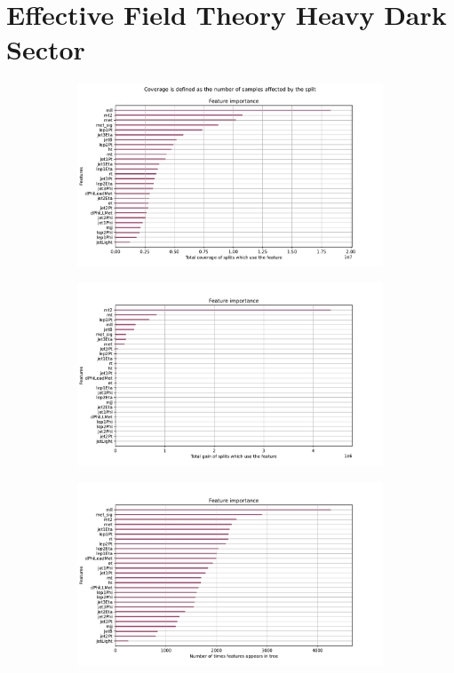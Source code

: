 \documentclass[12pt, a4paper]{book}
\begin{document}
\section{Effective Field Theory Heavy Dark Sector}
\begin{figure}[!ht]
	\centering
	\begin{subfigure}[b]{0.7\textwidth}
      \centering
      \includegraphics[width=1\textwidth]{XGBoost/EFT_HDS/feature_importance/total_cover.pdf}
      \end{subfigure}
      \hfill
      \begin{subfigure}[b]{0.7\textwidth}
         \centering
         \includegraphics[width=1\textwidth]{XGBoost/EFT_HDS/feature_importance/total_gain.pdf}
      \end{subfigure}
      \hfill
      \begin{subfigure}[b]{0.7\textwidth}
         \centering
         \includegraphics[width=1\textwidth]{XGBoost/EFT_HDS/feature_importance/weight.pdf}

\end{subfigure}
\end{figure}
\end{document}
